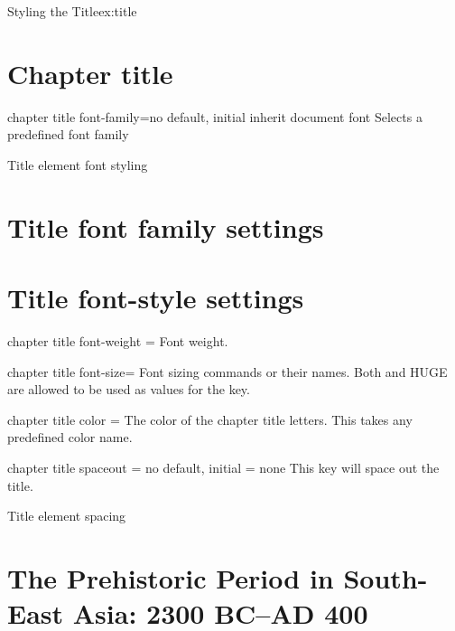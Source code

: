 \begin{texexample}{Styling the Title}{ex:title} 
\chapter{Chapter title}
\lorem
\end{texexample}


\begin{docKey}[phd]{chapter title font-family}{=}{no default, initial inherit document font}
Selects a predefined font family
\end{docKey}

\begin{texexample}{Title element font styling}{}
\chapter{Title font family settings}
\lorem
{}
\chapter{Title font-style settings}
\lorem
\end{texexample}


\begin{docKey}[phd]{chapter title font-weight}{ = } {}
Font weight.
\end{docKey}

\begin{docKey}[phd]{chapter title font-size}{= }{}
Font sizing commands or their names. Both \docAuxCommand{\HUGE} and HUGE are allowed to be used as values for the key.
\end{docKey}

\begin{docKey}[phd]{chapter title color} { = } {}
The color of the chapter title letters. This takes any predefined color name. 
\end{docKey}


\begin{docKey}[phd]{chapter title spaceout}{ = } {no default, initial = none}
 This key will space out the title. 
\end{docKey}

\begin{texexample}{Title element spacing}{}
\chapter{The Prehistoric Period in South-East Asia: 2300 BC--AD 400}        
\lorem 
    
\end{texexample}



